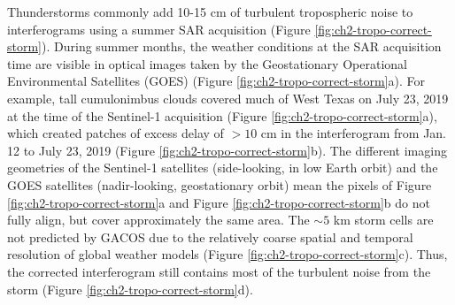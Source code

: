 Thunderstorms commonly add 10-15 cm of turbulent tropospheric noise to interferograms using a summer SAR acquisition (Figure \ref{fig:ch2-tropo-correct-storm}).
During summer months, the weather conditions at the SAR acquisition time are visible in optical images taken by the Geostationary Operational Environmental Satellites (GOES) (Figure \ref{fig:ch2-tropo-correct-storm}a).
For example, tall cumulonimbus clouds covered much of West Texas on July 23, 2019 at the time of the Sentinel-1 acquisition (Figure \ref{fig:ch2-tropo-correct-storm}a), which created patches of excess delay of $>10$ cm in the interferogram from Jan. 12 to July 23, 2019 (Figure \ref{fig:ch2-tropo-correct-storm}b).
The different imaging geometries of the Sentinel-1 satellites (side-looking, in low Earth orbit) and the GOES satellites (nadir-looking, geostationary orbit) mean the pixels of Figure \ref{fig:ch2-tropo-correct-storm}a and Figure \ref{fig:ch2-tropo-correct-storm}b do not fully align, but cover approximately the same area.
The $\sim 5$ km storm cells are not predicted by GACOS due to the relatively coarse spatial and temporal resolution of global weather models (Figure \ref{fig:ch2-tropo-correct-storm}c). Thus, the corrected interferogram still contains most of the turbulent noise from the storm (Figure \ref{fig:ch2-tropo-correct-storm}d).


